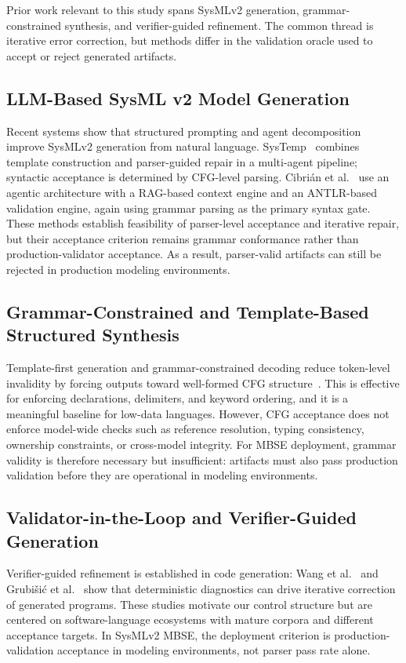 \documentclass[colorlinks,upint,subscriptcorrection,varvw,hyphenate,balance]{asmeconf} %
\begin{document}
Prior work relevant to this study spans SysMLv2 generation, grammar-constrained synthesis, and verifier-guided refinement. The common thread is iterative error correction, but methods differ in the validation oracle used to accept or reject generated artifacts.

\subsection{LLM-Based SysML v2 Model Generation}
Recent systems show that structured prompting and agent decomposition improve SysMLv2 generation from natural language. SysTemp~\cite{bouamra2025systemp} combines template construction and parser-guided repair in a multi-agent pipeline; syntactic acceptance is determined by CFG-level parsing. Cibri{\'a}n et al.~\cite{cibrian2025sysmlagent} use an agentic architecture with a RAG-based context engine and an ANTLR-based validation engine, again using grammar parsing as the primary syntax gate. These methods establish feasibility of parser-level acceptance and iterative repair, but their acceptance criterion remains grammar conformance rather than production-validator acceptance. As a result, parser-valid artifacts can still be rejected in production modeling environments.

\subsection{Grammar-Constrained and Template-Based Structured Synthesis}
Template-first generation and grammar-constrained decoding reduce token-level invalidity by forcing outputs toward well-formed CFG structure~\cite{bouamra2025systemp,cibrian2025sysmlagent}. This is effective for enforcing declarations, delimiters, and keyword ordering, and it is a meaningful baseline for low-data languages. However, CFG acceptance does not enforce model-wide checks such as reference resolution, typing consistency, ownership constraints, or cross-model integrity. For MBSE deployment, grammar validity is therefore necessary but insufficient: artifacts must also pass production validation before they are operational in modeling environments.

\subsection{Validator-in-the-Loop and Verifier-Guided Generation}
Verifier-guided refinement is established in code generation: Wang et al.~\cite{wang2022compilable} and Grubi{\v{s}}i{\'c} et al.~\cite{grubisic2024compiler} show that deterministic diagnostics can drive iterative correction of generated programs. These studies motivate our control structure but are centered on software-language ecosystems with mature corpora and different acceptance targets. In SysMLv2 MBSE, the deployment criterion is production-validation acceptance in modeling environments, not parser pass rate alone.
\end{document}

